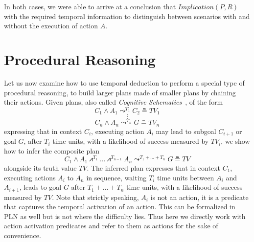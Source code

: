 \documentclass[runningheads]{llncs}
\newcommand{\TImpl}{\textit{Implication}}
\newcommand{\TTV}{\textit{TV}}
\newcommand{\TTVo}{\textit{TV}_1}
\newcommand{\TTVi}{\textit{TV}_i}
\newcommand{\TTVn}{\textit{TV}_n}
\newcommand{\lpreimp}[1]{\leadsto^{#1}}
\newcommand{\lseqand}[1]{\bigslopedwedge^{#1}}
\newcommand{\ldo}[1]{\widehat{#1}}
\begin{document}
\noindent In both cases, we were able to arrive at a conclusion that $\TImpl(P, R)$ with the required temporal information to distinguish between scenarios with and without the execution of action $A$.

\section{Procedural Reasoning}
\label{sec:procedural}
Let us now examine how to use temporal deduction to perform a special
type of procedural reasoning, to build larger plans made of smaller
plans by chaining their actions.  Given plans, also called
\emph{Cognitive Schematics}~\cite{Goertzel2011CSP}, of the form
$$C_1 \land A_1 \lpreimp{T_1} C_2 \measeq \TTVo$$
$$\vdots$$
$$C_n \land A_n \lpreimp{T_n} G \measeq \TTVn$$
expressing that in context $C_i$, executing action $A_i$ may lead to
subgoal $C_{i+1}$ or goal $G$, after $T_i$ time units, with a
likelihood of success measured by $\TTVi$, we show how to infer the
composite plan
$$C_1 \land A_1 \lseqand{T_1} \dots \lseqand{T_{n-1}} A_n
\lpreimp{T_1+\dots+T_n} G \measeq \TTV$$ alongside its truth value
$\TTV$.  The inferred plan expresses that in context $C_1$, executing
actions $A_i$ to $A_n$ in sequence, waiting $T_i$ time units between
$A_i$ and $A_{i+1}$, leads to goal $G$ after $T_1+\dots+T_n$ time
units, with a likelihood of success measured by $\TTV$.  Note that
strictly speaking, $A_i$ is not an action, it is a predicate that
captures the temporal activation of an action.  This can be formalized
in PLN as well but is not where the difficulty lies.  Thus here we
directly work with action activation predicates and refer to them as
actions for the sake of convenience.


\end{document}
